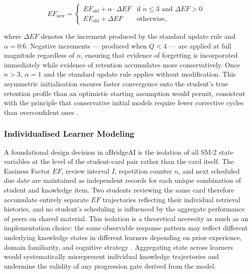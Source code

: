 \begin{equation}
EF_{\text{new}} = 
\begin{cases}
EF_{\text{old}} + \alpha \cdot \Delta EF 
  & \text{if } n \leq 3 \text{ and } \Delta EF > 0 \\
EF_{\text{old}} + \Delta EF 
  & \text{otherwise},
\end{cases}
\end{equation}

where $\Delta EF$ denotes the increment produced by the standard update rule and $\alpha = 0.6$. Negative increments — produced when $Q < 4$ — are applied at full magnitude regardless of $n$, ensuring that evidence of forgetting is incorporated immediately while evidence of retention accumulates more conservatively. Once $n > 3$, $\alpha = 1$ and the standard update rule applies without modification. This asymmetric initialisation ensures faster convergence onto the student's true retention profile than an optimistic starting assumption would permit, consistent with the principle that conservative initial models require fewer corrective cycles than overconfident ones \cite{wozniak1998sm2}.

\subsubsection{Individualised Learner Modeling}
\label{sec:individualised_modeling}
A foundational design decision in aBridgeAI is the isolation of all SM-2 state variables at the level of the student-card pair rather than the card itself. The Easiness Factor $EF$, review interval $I$, repetition counter $n$, and next scheduled due date are maintained as independent records for each unique combination of student and knowledge item. Two students reviewing the same card therefore accumulate entirely separate $EF$ trajectories reflecting their individual retrieval histories, and no student's scheduling is influenced by the aggregate performance of peers on shared material. This isolation is a theoretical necessity as much as an implementation choice: the same observable response pattern may reflect different underlying knowledge states in different learners depending on prior experience, domain familiarity, and cognitive strategy \cite{corbett1994, vanlehn2006}. Aggregating state across learners would systematically misrepresent individual knowledge trajectories and undermine the validity of any progression gate derived from the model.

